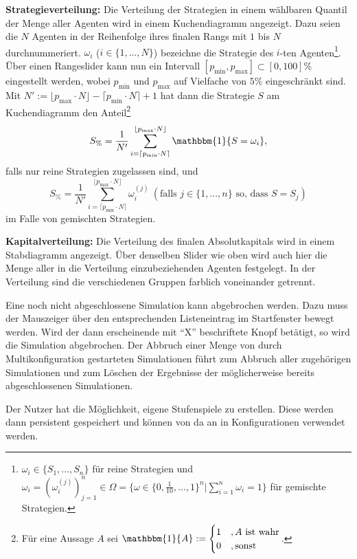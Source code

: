 \documentclass[parskip=full,11pt]{scrartcl}
\begin{document}
\textbf{Strategieverteilung:}
Die Verteilung der Strategien in einem wählbaren Quantil der Menge aller Agenten wird in einem Kuchendiagramm angezeigt. Dazu seien die \(N\) Agenten in der Reihenfolge ihres finalen Rangs mit \(1\) bis \(N\) durchnummeriert. \(\omega_i\) (\(i \in \{1,...,N\}\)) bezeichne die Strategie des \(i\)-ten Agenten\footnote{\(\omega_i \in \{S_1,...,S_n\}\) für reine Strategien und \(\omega_i = (\omega_i^{(j)})_{j=1}^n \in \Omega = \{\omega \in \{0,\frac{1}{10},...,1\}^n | \sum_{i=1}^n \omega_i = 1\}\) für gemischte Strategien.}. Über einen Rangeslider kann nun ein Intervall \([p_\text{min},p_\text{max}] \subset [0,100]\%\) eingestellt werden, wobei \(p_\text{min}\) und \(p_\text{max}\) auf Vielfache von \(5\%\) eingeschränkt sind. Mit \(N' := \lfloor p_\text{max} \cdot N \rfloor - \lceil p_\text{min} \cdot N \rceil + 1\) hat dann die Strategie \(S\) am Kuchendiagramm den Anteil\footnote{Für eine Aussage \(A\) sei \(\mathbbm{1}\{A\} := \begin{cases} 1 & , A \text{ ist wahr} \\ 0 &, \text{sonst}\end{cases}\).}
\[
S_\% = \frac{1}{N'} \sum_{i=\lceil p_\text{min} \cdot N \rceil}^{\lfloor p_\text{max} \cdot N \rfloor} \mathbbm{1}\{S = \omega_i\},
\]
falls nur reine Strategien zugelassen sind, und
\[
S_\% = \frac{1}{N'} \sum_{i=\lceil p_\text{min} \cdot N \rceil}^{\lfloor p_\text{max} \cdot N \rfloor} \omega_i^{(j)}  \ (\text{falls } j \in \{1,...,n\} \text{ so, dass } S = S_j)
\]
im Falle von gemischten Strategien.

\textbf{Kapitalverteilung:}
Die Verteilung des finalen Absolutkapitals wird in einem Stabdiagramm angezeigt. Über denselben Slider wie oben wird auch hier die Menge aller in die Verteilung einzubeziehenden Agenten festgelegt. In der Verteilung sind die verschiedenen Gruppen farblich voneinander getrennt.

Eine noch nicht abgeschlossene Simulation kann abgebrochen werden. Dazu muss der Mauszeiger über den entsprechenden Listeneintrag im Startfenster bewegt werden. Wird der dann erscheinende mit \enquote{X} beschriftete Knopf betätigt, so wird die Simulation abgebrochen. Der Abbruch einer Menge von durch Multikonfiguration gestarteten Simulationen führt zum Abbruch aller zugehörigen Simulationen und zum Löschen der Ergebnisse der möglicherweise bereits abgeschlossenen Simulationen.

Der Nutzer hat die Möglichkeit, eigene Stufenspiele zu erstellen. Diese werden dann persistent gespeichert und können von da an in Konfigurationen verwendet werden.
\end{document}

